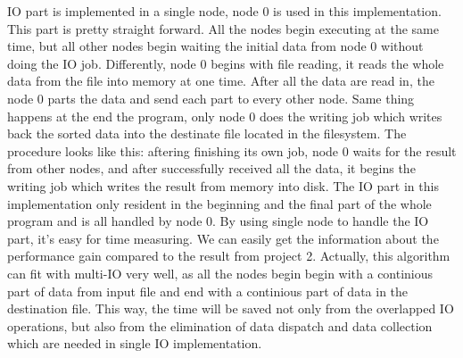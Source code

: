 \documentclass[11pt,letterpaper,oneside]{article}
\begin{document}
IO part is implemented in a single node, node 0 is used in this implementation. This part is pretty straight forward. All the nodes begin executing at the same time, but all other nodes begin waiting the initial data from node 0 without doing the IO job. Differently, node 0 begins with file reading, it reads the whole data from the file into memory at one time. After all the data are read in, the node 0 parts the data and send each part to every other node. Same thing happens at the end the program, only node 0 does the writing job which writes back the sorted data into the destinate file located in the filesystem. The procedure looks like this: aftering finishing its own job, node 0 waits for the result from other nodes, and after successfully received all the data, it begins the writing job which writes the result from memory into disk. The IO part in this implementation only resident in the beginning and the final part of the whole program and is all handled by node 0. By using single node to handle the IO part, it's easy for time measuring. We can easily get the information about the performance gain compared to the result from project 2. Actually, this algorithm can fit with multi-IO very well, as all the nodes begin begin with a continious part of data from input file and end with a continious part of data in the destination file. This way, the time will be saved not only from the overlapped IO operations, but also from the elimination of data dispatch and data collection which are needed in single IO implementation.
\end{document}
